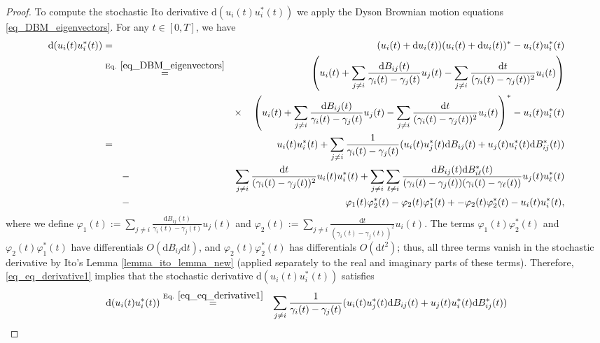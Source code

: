 \documentclass[11pt,letterpaper]{article}
\begin{document}
\begin{proof}
%
To compute the stochastic Ito derivative $\mathrm{d}(u_i(t) u_i^\ast(t))$ we apply the Dyson Brownian motion equations \eqref{eq_DBM_eigenvectors}.
%
For any $t \in [0,T]$, we have
%
\begin{eqnarray}\label{eq_eq_derivative1}
  \mathrm{d}(u_i(t) u_i^\ast(t))
 & =& (u_i(t) + \mathrm{d}u_i(t))(u_i(t) + \mathrm{d}u_i(t))^\ast - u_i(t)u_i^\ast(t) \nonumber\\
  &\stackrel{\textrm{Eq. }  \eqref{eq_DBM_eigenvectors}}{=} &\left(u_i(t)+ \sum_{j \neq i} \frac{\mathrm{d}B_{ij}(t)}{\gamma_i(t) - \gamma_j(t)}u_j(t) - \sum_{j \neq i} \frac{\mathrm{d}t}{(\gamma_i(t)- \gamma_j(t))^2}u_i(t) \right) \nonumber\\
  & &  \times \quad \left(u_i(t) + \sum_{j \neq i} \frac{\mathrm{d}B_{ij}(t)}{\gamma_i(t) - \gamma_j(t)}u_j(t) - \sum_{j \neq i} \frac{\mathrm{d}t}{(\gamma_i(t)- \gamma_j(t))^2}u_i(t) \right)^\ast - u_i(t)u_i^\ast(t) \nonumber\\
  &= & u_i(t) u_i^\ast(t) + \sum_{j \neq i} \frac{1}{\gamma_i(t) - \gamma_j(t)}(u_i(t) u_j^\ast(t)\mathrm{d}B_{ij}(t) + u_j(t) u_i^\ast(t)\mathrm{d}B_{ij}^\ast(t))\nonumber\\
  &\qquad -&   \sum_{j\neq i} \frac{\mathrm{d}t}{(\gamma_i(t)- \gamma_j(t))^2} u_i(t) u_i^\ast(t) +  \sum_{j \neq i}  \sum_{\ell \neq i} \frac{\mathrm{d}B_{ij}(t)\mathrm{d}B_{i\ell}^\ast(t)}{(\gamma_i(t) - \gamma_j(t)) (\gamma_i(t) - \gamma_\ell(t))} u_j(t)u_{\ell}^\ast(t) \nonumber\\
  & \qquad -&  \varphi_1(t)\varphi_2^\ast(t)  -\varphi_2(t)\varphi_1^\ast(t) + -\varphi_2(t)\varphi_2^\ast(t) - u_i(t)u_i^\ast(t),
  \end{eqnarray}
  where we define $\varphi_1(t):= \sum_{j \neq i} \frac{\mathrm{d}B_{ij}(t)}{\gamma_i(t) - \gamma_j(t)}u_j(t)$ and $\varphi_2(t):=\sum_{j \neq i} \frac{\mathrm{d}t}{(\gamma_i(t)- \gamma_j(t))^2}u_i(t)$.
%
The terms $\varphi_1(t) \varphi_2^\ast(t)$ and $\varphi_2(t) \varphi_1^\ast(t)$ have differentials $O(\mathrm{d}B_{ij} \mathrm{d}t)$, and $\varphi_2(t) \varphi_2^\ast(t)$ has differentials $O(\mathrm{d}t^2)$; thus, all three terms vanish in the stochastic derivative by Ito's Lemma \ref{lemma_ito_lemma_new} (applied separately to the real and imaginary parts of these terms).
%
Therefore, \eqref{eq_eq_derivative1} implies that the stochastic derivative $\mathrm{d}(u_i(t) u_i^\ast(t))$ satisfies
  \begin{eqnarray}
  \mathrm{d}(u_i(t) u_i^\ast(t)) &\stackrel{\textrm{Eq. }  \eqref{eq_eq_derivative1}}{=}&  \sum_{j \neq i} \frac{1}{\gamma_i(t) - \gamma_j(t)}(u_i(t) u_j^\ast(t) \mathrm{d}B_{ij}(t) + u_j(t) u_i^\ast(t) \mathrm{d}B_{ij}^\ast(t))\nonumber \\

\end{eqnarray}
\end{proof}
\end{document}
